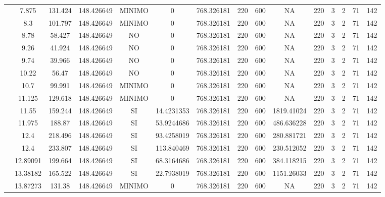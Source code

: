 \begin{table}[H]
{\begin{tabular}{|c|c|c|c|c|c|c|c|c|c|c|c|c|c|c|}
\cline{2-15}    & 7.875 & 131.424 & 148.426649 & MINIMO & 0   & 768.326181 & 220 & 600 & NA  & 220 & 3   & 2   & 71  & 142 \bigstrut\\
\cline{2-15}    & 8.3 & 101.797 & 148.426649 & MINIMO & 0   & 768.326181 & 220 & 600 & NA  & 220 & 3   & 2   & 71  & 142 \bigstrut\\
\cline{2-15}    & 8.78 & 58.427 & 148.426649 & NO  & 0   & 768.326181 & 220 & 600 & NA  & 220 & 3   & 2   & 71  & 142 \bigstrut\\
\cline{2-15}    & 9.26 & 41.924 & 148.426649 & NO  & 0   & 768.326181 & 220 & 600 & NA  & 220 & 3   & 2   & 71  & 142 \bigstrut\\
\cline{2-15}    & 9.74 & 39.966 & 148.426649 & NO  & 0   & 768.326181 & 220 & 600 & NA  & 220 & 3   & 2   & 71  & 142 \bigstrut\\
\cline{2-15}    & 10.22 & 56.47 & 148.426649 & NO  & 0   & 768.326181 & 220 & 600 & NA  & 220 & 3   & 2   & 71  & 142 \bigstrut\\
\cline{2-15}    & 10.7 & 99.991 & 148.426649 & MINIMO & 0   & 768.326181 & 220 & 600 & NA  & 220 & 3   & 2   & 71  & 142 \bigstrut\\
\cline{2-15}    & 11.125 & 129.618 & 148.426649 & MINIMO & 0   & 768.326181 & 220 & 600 & NA  & 220 & 3   & 2   & 71  & 142 \bigstrut\\
\cline{2-15}    & 11.55 & 159.244 & 148.426649 & SI  & 14.4231353 & 768.326181 & 220 & 600 & 1819.41024 & 220 & 3   & 2   & 71  & 142 \bigstrut\\
\cline{2-15}    & 11.975 & 188.87 & 148.426649 & SI  & 53.9244686 & 768.326181 & 220 & 600 & 486.636228 & 220 & 3   & 2   & 71  & 142 \bigstrut\\
\cline{2-15}    & 12.4 & 218.496 & 148.426649 & SI  & 93.4258019 & 768.326181 & 220 & 600 & 280.881721 & 220 & 3   & 2   & 71  & 142 \bigstrut\\
\cline{2-15}    & 12.4 & 233.807 & 148.426649 & SI  & 113.840469 & 768.326181 & 220 & 600 & 230.512052 & 220 & 3   & 2   & 71  & 142 \bigstrut\\
\cline{2-15}    & 12.89091 & 199.664 & 148.426649 & SI  & 68.3164686 & 768.326181 & 220 & 600 & 384.118215 & 220 & 3   & 2   & 71  & 142 \bigstrut\\
\cline{2-15}    & 13.38182 & 165.522 & 148.426649 & SI  & 22.7938019 & 768.326181 & 220 & 600 & 1151.26033 & 220 & 3   & 2   & 71  & 142 \bigstrut\\
\cline{2-15}    & 13.87273 & 131.38 & 148.426649 & MINIMO & 0   & 768.326181 & 220 & 600 & NA  & 220 & 3   & 2   & 71  & 142 \bigstrut\\

\end{tabular}}
\end{table}
